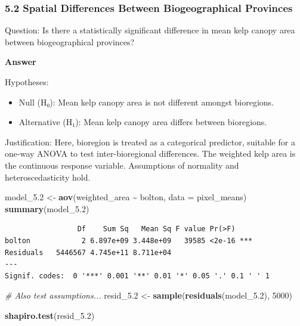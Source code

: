 \documentclass[
  british,
  10pt,
]{article}
\newenvironment{Shaded}{\begin{snugshade}}{\end{snugshade}}
\newcommand{\AttributeTok}[1]{\textcolor[rgb]{0.13,0.29,0.53}{#1}}
\newcommand{\CommentTok}[1]{\textcolor[rgb]{0.56,0.35,0.01}{\textit{#1}}}
\newcommand{\DecValTok}[1]{\textcolor[rgb]{0.00,0.00,0.81}{#1}}
\newcommand{\FloatTok}[1]{\textcolor[rgb]{0.00,0.00,0.81}{#1}}
\newcommand{\FunctionTok}[1]{\textcolor[rgb]{0.13,0.29,0.53}{\textbf{#1}}}
\newcommand{\NormalTok}[1]{#1}
\newcommand{\OtherTok}[1]{\textcolor[rgb]{0.56,0.35,0.01}{#1}}
\newcommand{\SpecialCharTok}[1]{\textcolor[rgb]{0.81,0.36,0.00}{\textbf{#1}}}
\providecommand{\tightlist}{%
  \setlength{\itemsep}{0pt}\setlength{\parskip}{0pt}}
\begin{document}
\subsubsection{5.2 Spatial Differences Between Biogeographical
Provinces}\label{spatial-differences-between-biogeographical-provinces}

Question: Is there a statistically significant difference in mean kelp
canopy area between biogeographical provinces?

\textbf{Answer}

Hypotheses:

\begin{itemize}
\tightlist
\item
  Null (H₀): Mean kelp canopy area is not different amongst bioregions.
\item
  Alternative (H₁): Mean kelp canopy area differs between bioregions.
\end{itemize}

Justification: Here, bioregion is treated as a categorical predictor,
suitable for a one-way ANOVA to test inter-bioregional differences. The
weighted kelp area is the continuous response variable. Assumptions of
normality and heteroscedasticity hold.

\begin{Shaded}
\begin{Highlighting}[]
\NormalTok{model\_5}\FloatTok{.2} \OtherTok{\textless{}{-}} \FunctionTok{aov}\NormalTok{(weighted\_area }\SpecialCharTok{\textasciitilde{}}\NormalTok{ bolton, }\AttributeTok{data =}\NormalTok{ pixel\_means)}
\FunctionTok{summary}\NormalTok{(model\_5}\FloatTok{.2}\NormalTok{)}
\end{Highlighting}
\end{Shaded}

\begin{verbatim}
                 Df    Sum Sq   Mean Sq F value Pr(>F)    
bolton            2 6.897e+09 3.448e+09   39585 <2e-16 ***
Residuals   5446567 4.745e+11 8.711e+04                   
---
Signif. codes:  0 '***' 0.001 '**' 0.01 '*' 0.05 '.' 0.1 ' ' 1
\end{verbatim}

\begin{Shaded}
\begin{Highlighting}[]
\CommentTok{\# Also test assumptions...}
\NormalTok{resid\_5}\FloatTok{.2} \OtherTok{\textless{}{-}} \FunctionTok{sample}\NormalTok{(}\FunctionTok{residuals}\NormalTok{(model\_5}\FloatTok{.2}\NormalTok{), }\DecValTok{5000}\NormalTok{)}

\FunctionTok{shapiro.test}\NormalTok{(resid\_5}\FloatTok{.2}\NormalTok{)}
\end{Highlighting}
\end{Shaded}
\end{document}
